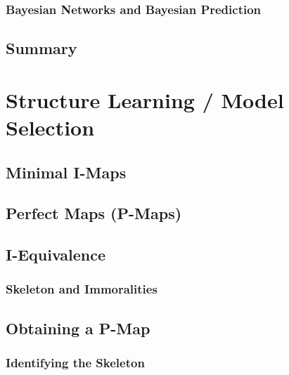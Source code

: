             \subsubsection{Bayesian Networks and Bayesian Prediction} %

        \subsection{Summary} %

    \section{Structure Learning / Model Selection} %

        \subsection{Minimal I-Maps} %

        \subsection{Perfect Maps (P-Maps)} %

        \subsection{I-Equivalence} %

            \subsubsection{Skeleton and Immoralities} %

        \subsection{Obtaining a P-Map} %

            \subsubsection{Identifying the Skeleton} %

